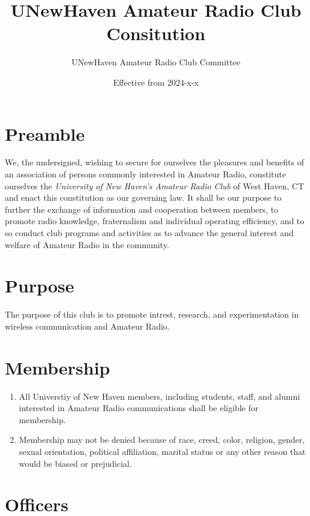 \documentclass[a4paper,12pt]{article}
\title{UNewHaven Amateur Radio Club Consitution}
\author{UNewHaven Amateur Radio Club Committee}
\date{Effective from 2024-x-x}
\begin{document}
\maketitle

\section{Preamble}
We, the undersigned, wishing to secure for ourselves the pleasures and benefits of an association of
persons commonly interested in Amateur Radio, constitute ourselves the \textit{University of New Haven's Amateur Radio Club}
of West Haven, CT and enact this constitution as our governing law. It shall be our purpose to further the exchange of
information and cooperation between members, to promote radio knowledge, fraternalism and
individual operating efficiency, and to so conduct club programs and activities as to advance the
general interest and welfare of Amateur Radio in the community.

\section{Purpose}
The purpose of this club is to promote intrest, research, and experimentation in wireless communication and Amateur Radio.

\section{Membership}
\begin{enumerate}[label=\thesection.\arabic*.]
  \item All Universtiy of New Haven members, including students, staff, and alumni interested in Amateur Radio communications shall be eligible for membership.
  \item Membership may not be denied because of race, creed, color, religion, gender, sexual orientation,
political affiliation, marital status or any other reason that would be biased or prejudicial.
\end{enumerate}


\section{Officers}

\end{document}
